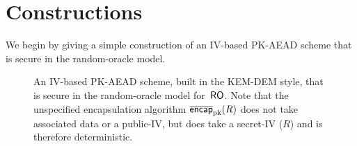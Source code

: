 \section{Constructions}
\label{sec:constructions}
We begin by giving a simple construction of an IV-based PK-AEAD scheme
that is secure in the random-oracle model. 
%

\begin{figure}
\begin{center}
\caption{An IV-based PK-AEAD scheme, built in the KEM-DEM style, that is secure in the random-oracle model for~$\mathsf{RO}$. Note that the unspecified encapsulation algorithm $\overline{\mathsf{encap}}_{\mathrm{pk}}^{}(R)$ does not take associated data or a public-IV, but does take a secret-IV ($R$) and
is therefore deterministic. }
\label{fig:ro-kem-dem-construction}
\end{center}
\end{figure}
